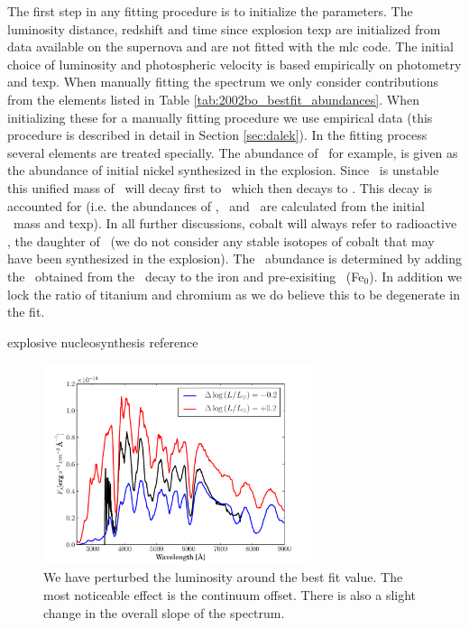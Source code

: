 The first step in any fitting procedure is to initialize the parameters. The luminosity distance, redshift and time since explosion \gls{texp} are initialized from data available on the supernova and are not fitted with the \gls{mlc} code. The initial choice of luminosity and photospheric velocity is based empirically on photometry and \gls{texp}. When manually fitting the spectrum we only consider contributions from the elements listed in Table \ref{tab:2002bo_bestfit_abundances}. When initializing these for a manually fitting procedure we use empirical data (this procedure is described in detail in Section \ref{sec:dalek}). In the fitting process several elements are treated specially. The abundance of \Ni\, for example, is given as the abundance of initial nickel synthesized in the explosion. Since \Ni\ is unstable this unified mass of \Ni\ will decay first to \Co\ which then decays to \Fe. This decay is accounted for (i.e. the abundances of \Ni, \Co\ and \Fe\ are calculated from the initial \Ni\ mass and \gls{texp}). In all further discussions, cobalt will always refer to radioactive \Co, the daughter of \Ni\ (we do not consider any stable isotopes of cobalt that may have been synthesized in the explosion). The \Fe\ abundance is determined by adding the \Fe\ obtained from the \Ni\ decay to the iron and pre-exisiting \Fe\ (Fe$_0$). In addition we lock the ratio of titanium and chromium as we do believe this to be degenerate in the fit. 

explosive nucleosynthesis reference \citep[e.g.][]{1999ApJS..125..439I}

\begin{figure}[tb] %
   \centering
   \includegraphics[width=0.7\textwidth]{chapter_dalek/plots/bf2002bo-10_lum.pdf} 
   \caption[Effect of luminosity on MLMC fit]{We have perturbed the luminosity around the best fit value. The most noticeable effect is the continuum offset. There is also a slight change in the overall slope of the spectrum.} 
   \label{fig:sn2002bo_lum_offset}
\end{figure}

